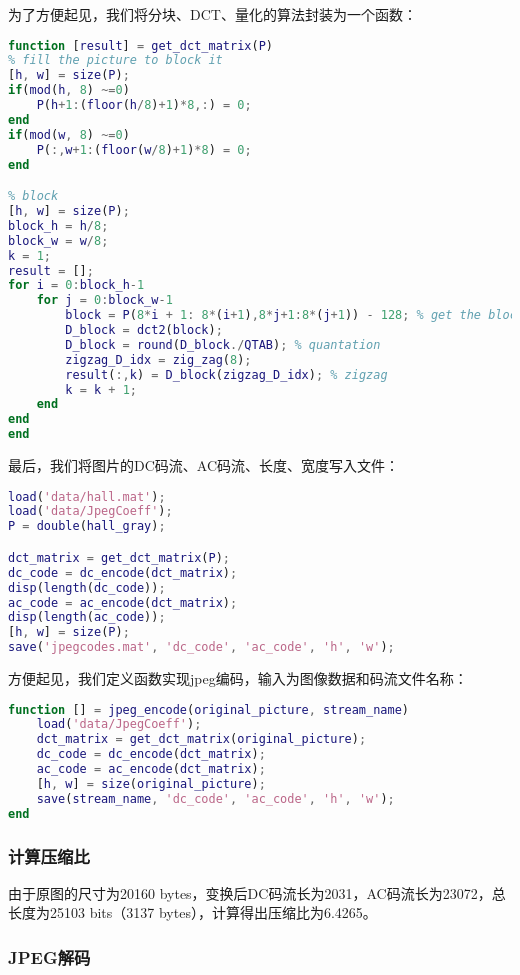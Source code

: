 \documentclass[a4paper]{article}
\begin{document}
\par 为了方便起见，我们将分块、DCT、量化的算法封装为一个函数：
\begin{lstlisting}[language=matlab, caption=分块、DCT、量化]
function [result] = get_dct_matrix(P)
% fill the picture to block it
[h, w] = size(P);
if(mod(h, 8) ~=0)
    P(h+1:(floor(h/8)+1)*8,:) = 0;
end
if(mod(w, 8) ~=0)
    P(:,w+1:(floor(w/8)+1)*8) = 0;
end

% block
[h, w] = size(P);
block_h = h/8;
block_w = w/8;
k = 1;
result = [];
for i = 0:block_h-1
    for j = 0:block_w-1
        block = P(8*i + 1: 8*(i+1),8*j+1:8*(j+1)) - 128; % get the block
        D_block = dct2(block);
        D_block = round(D_block./QTAB); % quantation
        zigzag_D_idx = zig_zag(8);
        result(:,k) = D_block(zigzag_D_idx); % zigzag
        k = k + 1;
    end
end
end
\end{lstlisting}

\par 最后，我们将图片的DC码流、AC码流、长度、宽度写入文件：
\begin{lstlisting}[language=matlab, caption=写入文件]
load('data/hall.mat');
load('data/JpegCoeff');
P = double(hall_gray);

dct_matrix = get_dct_matrix(P);
dc_code = dc_encode(dct_matrix);
disp(length(dc_code));
ac_code = ac_encode(dct_matrix);
disp(length(ac_code));
[h, w] = size(P);
save('jpegcodes.mat', 'dc_code', 'ac_code', 'h', 'w');
\end{lstlisting}

\par 方便起见，我们定义函数实现jpeg编码，输入为图像数据和码流文件名称：
\begin{lstlisting}[language=matlab, caption=jpeg-encode.m]
function [] = jpeg_encode(original_picture, stream_name)
    load('data/JpegCoeff');
    dct_matrix = get_dct_matrix(original_picture);
    dc_code = dc_encode(dct_matrix);
    ac_code = ac_encode(dct_matrix);
    [h, w] = size(original_picture);
    save(stream_name, 'dc_code', 'ac_code', 'h', 'w');
end
\end{lstlisting}


\subsubsection{计算压缩比}
\par 由于原图的尺寸为20160 bytes，变换后DC码流长为2031，AC码流长为23072，总长度为25103 bits（3137 bytes），计算得出压缩比为6.4265。

\subsubsection{JPEG解码}
\end{document}
